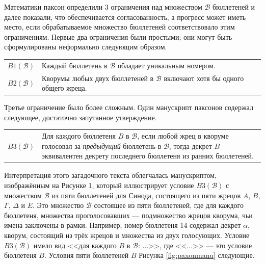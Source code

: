 \documentclass[12pt, a4paper]{article} %
\begin{document}
Математики паксон определили 3 ограничения над множеством $\mathcal{B}$ бюллетеней и далее показали, что обеспечивается согласованность, а прогресс может иметь место, если обрабатываемое множество бюллетеней соответствовало этим ограничениям. Первые два ограничения были простыми; они могут быть сформулированы неформально следующим образом.
\begin{table}[h]
\begin{tabular}{l p{10.5cm}}
    $B1(\mathcal{B})$ & Каждый бюллетень в $\mathcal{B}$ обладает уникальным номером.\\
    $B2(\mathcal{B})$ & Кворумы любых двух бюллетеней в $\mathcal{B}$ включают хотя бы одного общего жреца.
\end{tabular}
\end{table}

Третье ограничение было более сложным. Один манускрипт паксонов содержал следующее, достаточно запутанное утверждение.
\begin{table}[h]
\begin{tabular}{l p{10.5cm}}
    $B3(\mathcal{B})$ & Для каждого бюллетеня $B$ в $\mathcal{B}$, если любой жрец в кворуме голосовал за \textit{предыдущий} бюллетень в $\mathcal{B}$, тогда декрет $B$ эквивалентен декрету последнего бюллетеня из ранних бюллетеней. 
\end{tabular}
\end{table}

Интерпретация этого загадочного текста облегчалась манускриптом, изображённым на Рисунке 1, который иллюстрирует условие $B3(\mathcal{B})$ с множеством $\mathcal{B}$ из пяти бюллетеней для Синода, состоящего из пяти жрецов $A$, $B$, $\Gamma$, $\Delta$ и $E$. Это множество $\mathcal{B}$ состоящее из пяти бюллетеней, где для каждого бюллетеня, множества проголосовавших --- подмножество жрецов кворума, чьи имена заключены в рамки. Например, номер бюллетеня 14 содержал декрет $\alpha$, кворум, состоящий из трёх жрецов и множества из двух голосующих. Условие $B3(\mathcal{B})$ имело вид <<для каждого $B$ в $\mathcal{B}$: $\ldots$>>, где <<$\ldots$>> --- это условие бюллетеня $B$. Условия пяти бюллетеней $B$ Рисунка \ref{fig:paxonmanu} следующие.
\end{document}
